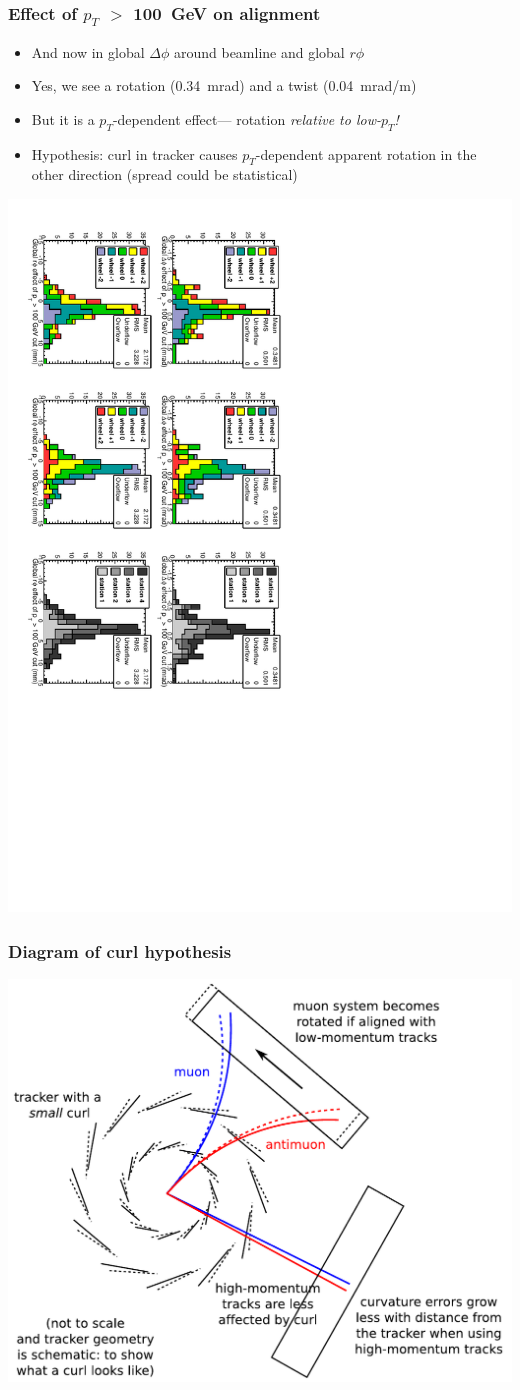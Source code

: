 \documentclass[compress]{beamer}
\begin{document}
\begin{frame}
\frametitle{Effect of $p_T$ $>$ 100~GeV on alignment}

\begin{itemize}
\item And now in global $\Delta \phi$ around beamline and global $r\phi$
\item Yes, we see a rotation (0.34~mrad) and a twist (0.04~mrad/m)
\item But it is a $p_T$-dependent effect--- rotation {\it relative to low-$p_T$!}
\item Hypothesis: curl in tracker causes $p_T$-dependent apparent rotation in the other direction (spread could be statistical)
\end{itemize}

\includegraphics[height=\linewidth, angle=90]{data_effect_of_100GeVcut3.pdf}
\end{frame}

\begin{frame}
\frametitle{Diagram of curl hypothesis}

\includegraphics[width=\linewidth]{curl_explanation.pdf}
\end{frame}
\end{document}
